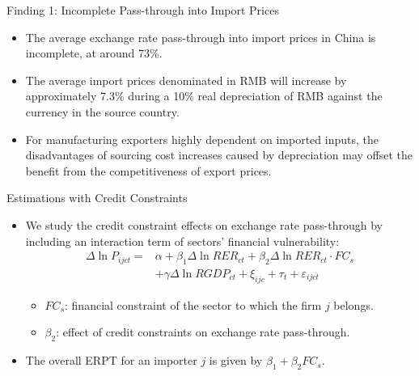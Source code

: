\documentclass[10pt]{beamer}
\begin{document}
\begin{frame}{Finding 1: Incomplete Pass-through into Import Prices}
    \begin{tcolorbox}[colback=blue!5!white, colframe=blue!75!black,title=Finding 1]
	\begin{itemize}
		\item The average exchange rate pass-through into import prices in China is incomplete, at around 73\%.
	\end{itemize}
    \end{tcolorbox}
    \begin{itemize}
	\item The average import prices denominated in RMB will increase by approximately 7.3\% during a 10\% real depreciation of RMB against the currency in the source country.
	\item For manufacturing exporters highly dependent on imported inputs, the disadvantages of sourcing cost increases caused by depreciation may offset the benefit from the competitiveness of export prices.
    \end{itemize}
\end{frame}

\begin{frame}{Estimations with Credit Constraints}
	\begin{itemize}
		\item We study the credit constraint effects on exchange rate pass-through by including an interaction term of sectors’ financial vulnerability:
		\begin{equation}
			\begin{aligned}
				\Delta \ln P_{ijct}=&\alpha+\beta_{1} \Delta \ln RER_{ct}+\beta_{2} \Delta \ln RER_{ct} \cdot FC_{s} \\ &+\gamma \Delta \ln RGDP_{ct}+\xi_{ijc}+\tau_{t} +\varepsilon_{ijct}
			\end{aligned}
			\label{eq.credit}
		\end{equation}
		\begin{itemize}
		    \item $FC_{s}$: financial constraint of the sector to which the firm $j$ belongs.
                \item $\beta_2$: effect of credit constraints on exchange rate pass-through.
		\end{itemize}
		\item The overall ERPT for an importer $j$ is given by $\beta_{1} +\beta_{2} FC_{s}$.
	\end{itemize}
\end{frame}
\end{document}
